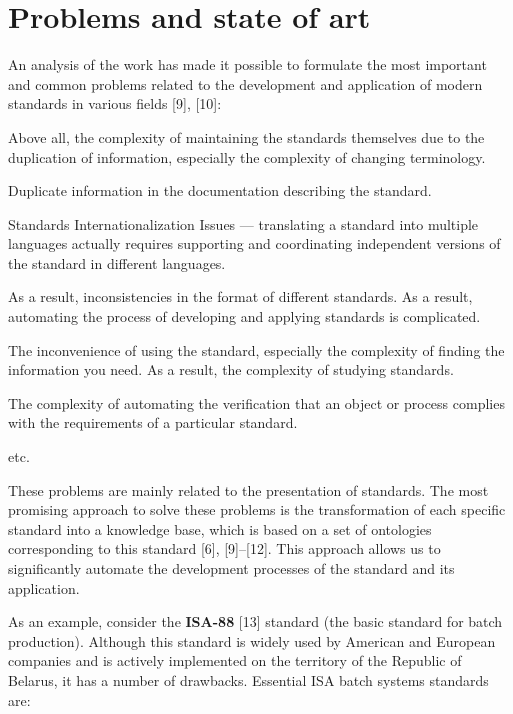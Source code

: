 \documentclass[10pt, a4paper]{proc}
\begin{document}
{\section{\normalsize{Problems and state of art}}

An analysis of the work has made it possible to
formulate the most important and common problems
related to the development and application of modern
standards in various fields [9], [10]:

\begin{itemize}[noitemsep]
\normalsize{
  \item Above all, the complexity of maintaining the standards themselves due to the duplication of information, especially the complexity of changing terminology.
  \item Duplicate information in the documentation describing the standard.
  \item Standards Internationalization Issues — translating
a standard into multiple languages actually requires
supporting and coordinating independent versions of
the standard in different languages.
\item As a result, inconsistencies in the format of different
standards. As a result, automating the process of
developing and applying standards is complicated.
\item The inconvenience of using the standard, especially
the complexity of finding the information you need.
As a result, the complexity of studying standards.
\item The complexity of automating the verification that
an object or process complies with the requirements
of a particular standard.
\item etc.}
\end{itemize}

These problems are mainly related to the presentation
of standards. The most promising approach to solve these
problems is the transformation of each specific standard
into a knowledge base, which is based on a set of
ontologies corresponding to this standard [6], [9]–[12].
This approach allows us to significantly automate the development processes of the standard and its application.
\par As an example, consider the \textbf{ISA-88} [13] standard
(the basic standard for batch production). Although this
standard is widely used by American and European
companies and is actively implemented on the territory
of the Republic of Belarus, it has a number of drawbacks.
Essential ISA batch systems standards are:

}
\end{document}
